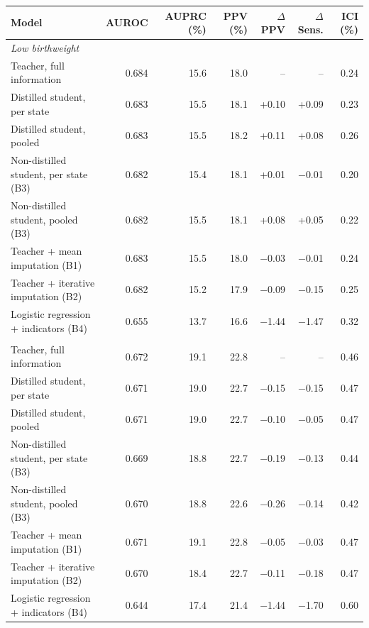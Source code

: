 \begin{tabular}{lrrrrrr}
\toprule
Model & AUROC & AUPRC (\%) & PPV (\%) & $\Delta$PPV & $\Delta$Sens. & ICI (\%)\\
\midrule
\multicolumn{7}{l}{\textit{Low birthweight}}\\
\quad Teacher, full information & 0.684 & 15.6 & 18.0 & -- & -- & 0.24\\
\quad Distilled student, per state & 0.683 & 15.5 & 18.1 & +0.10 & +0.09 & 0.23\\
\quad Distilled student, pooled & 0.683 & 15.5 & 18.2 & +0.11 & +0.08 & 0.26\\
\quad Non-distilled student, per state (B3) & 0.682 & 15.4 & 18.1 & +0.01 & $-$0.01 & 0.20\\
\quad Non-distilled student, pooled (B3) & 0.682 & 15.5 & 18.1 & +0.08 & +0.05 & 0.22\\
\quad Teacher + mean imputation (B1) & 0.683 & 15.5 & 18.0 & $-$0.03 & $-$0.01 & 0.24\\
\quad Teacher + iterative imputation (B2) & 0.682 & 15.2 & 17.9 & $-$0.09 & $-$0.15 & 0.25\\
\quad Logistic regression + indicators (B4) & 0.655 & 13.7 & 16.6 & $-$1.44 & $-$1.47 & 0.32\\
\addlinespace
\multicolumn{7}{l}{\textit{Preterm birth}}\\
\quad Teacher, full information & 0.672 & 19.1 & 22.8 & -- & -- & 0.46\\
\quad Distilled student, per state & 0.671 & 19.0 & 22.7 & $-$0.15 & $-$0.15 & 0.47\\
\quad Distilled student, pooled & 0.671 & 19.0 & 22.7 & $-$0.10 & $-$0.05 & 0.47\\
\quad Non-distilled student, per state (B3) & 0.669 & 18.8 & 22.7 & $-$0.19 & $-$0.13 & 0.44\\
\quad Non-distilled student, pooled (B3) & 0.670 & 18.8 & 22.6 & $-$0.26 & $-$0.14 & 0.42\\
\quad Teacher + mean imputation (B1) & 0.671 & 19.1 & 22.8 & $-$0.05 & $-$0.03 & 0.47\\
\quad Teacher + iterative imputation (B2) & 0.670 & 18.4 & 22.7 & $-$0.11 & $-$0.18 & 0.47\\
\quad Logistic regression + indicators (B4) & 0.644 & 17.4 & 21.4 & $-$1.44 & $-$1.70 & 0.60\\
\bottomrule
\end{tabular}
